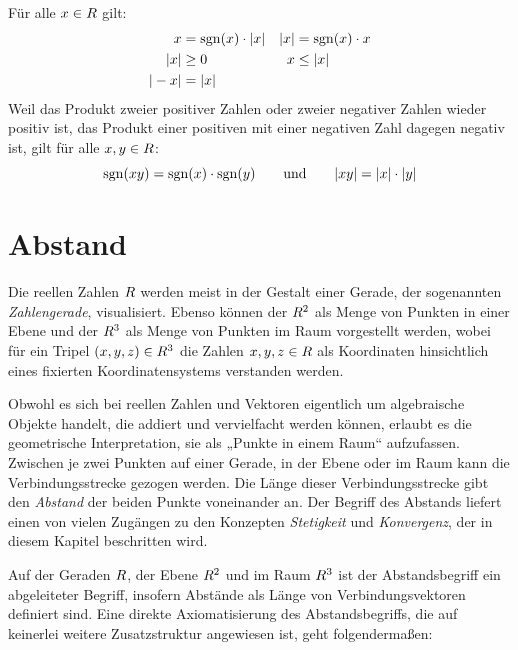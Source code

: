\begin{bem}
    Für alle $x\in \relax R$ gilt:
    \begin{align*}
        x & = \operatorname{sgn}(x)\cdot \vert x\vert & \vert x \vert & = \operatorname{sgn}(x)\cdot x \\
        \vert x\vert & \ge 0 & x & \le \vert x\vert \\
        \vert -x\vert & = \vert x\vert
    \end{align*}
    Weil das Produkt zweier positiver Zahlen oder zweier negativer Zahlen wieder positiv ist, das Produkt einer positiven mit einer negativen Zahl dagegen negativ ist, gilt für alle $x,y\in \relax R$:
        \[ \operatorname{sgn}(xy) = \operatorname{sgn}(x)\cdot \operatorname{sgn}(y) \qquad\text{und}\qquad \vert xy \vert = \vert x\vert\cdot \vert y\vert \]
\end{bem}





\section{Abstand}


\begin{bem}
    Die reellen Zahlen $\relax R$ werden meist in der Gestalt einer Gerade, der sogenannten \emph{Zahlengerade}, visualisiert. Ebenso können der $\relax R^2$ als Menge von Punkten in einer Ebene und der $\relax R^3$ als Menge von Punkten im Raum vorgestellt werden, wobei für ein Tripel $(x,y,z)\in \relax R^3$ die Zahlen $x,y,z\in \relax R$ als Koordinaten hinsichtlich eines fixierten Koordinatensystems verstanden werden.
    
    Obwohl es sich bei reellen Zahlen und Vektoren eigentlich um algebraische Objekte handelt, die addiert und vervielfacht werden können, erlaubt es die geometrische Interpretation, sie als „Punkte in einem Raum“ aufzufassen. Zwischen je zwei Punkten auf einer Gerade, in der Ebene oder im Raum kann die Verbindungsstrecke gezogen werden. Die Länge dieser Verbindungsstrecke gibt den \emph{Abstand} der beiden Punkte voneinander an. Der Begriff des Abstands liefert einen von vielen Zugängen zu den Konzepten \emph{Stetigkeit} und \emph{Konvergenz}, der in diesem Kapitel beschritten wird.
    
    Auf der Geraden $\relax R$, der Ebene $\relax R^2$ und im Raum $\relax R^3$ ist der Abstandsbegriff ein abgeleiteter Begriff, insofern Abstände als Länge von Verbindungsvektoren definiert sind. Eine direkte Axiomatisierung des Abstandsbegriffs, die auf keinerlei weitere Zusatzstruktur angewiesen ist, geht folgendermaßen:
\end{bem}


